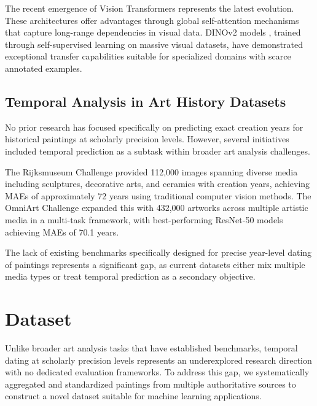 \documentclass[10pt,twocolumn,letterpaper]{article}
\begin{document}
The recent emergence of Vision Transformers represents the latest evolution. These architectures offer advantages through global self-attention mechanisms that capture long-range dependencies in visual data. DINOv2 models \cite{Oquab23}, trained through self-supervised learning on massive visual datasets, have demonstrated exceptional transfer capabilities suitable for specialized domains with scarce annotated examples.

\subsection{Temporal Analysis in Art History Datasets}

No prior research has focused specifically on predicting exact creation years for historical paintings at scholarly precision levels. However, several initiatives included temporal prediction as a subtask within broader art analysis challenges.

The Rijksmuseum Challenge \cite{Mensink14} provided 112,000 images spanning diverse media including sculptures, decorative arts, and ceramics with creation years, achieving MAEs of approximately 72 years using traditional computer vision methods. The OmniArt Challenge \cite{Strezoski18} expanded this with 432,000 artworks across multiple artistic media in a multi-task framework, with best-performing ResNet-50 models achieving MAEs of 70.1 years.

The lack of existing benchmarks specifically designed for precise year-level dating of paintings represents a significant gap, as current datasets either mix multiple media types or treat temporal prediction as a secondary objective.

\section{Dataset}

Unlike broader art analysis tasks that have established benchmarks, temporal dating at scholarly precision levels represents an underexplored research direction with no dedicated evaluation frameworks. To address this gap, we systematically aggregated and standardized paintings from multiple authoritative sources to construct a novel dataset suitable for machine learning applications.
\end{document}
